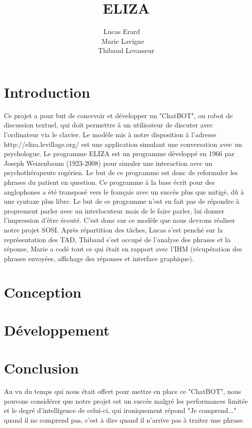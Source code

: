 \documentclass[a4paper,12pt]{article}
\title{ELIZA}
\author{Lucas Erard ~~\\ Marie Lavigne~~\\ Thibaud Levasseur}
\begin{document}
\maketitle
\newpage
\tableofcontents
\newpage
\section{Introduction}
Ce projet a pour but de concevoir et développer un "ChatBOT", ou robot de discussion textuel, qui doit permettre à un utilisateur de discuter avec l'ordinateur via le clavier. Le modèle mis à notre disposition à l'adresse http://eliza.levillage.org/ est une application simulant une conversation avec un psychologue.
Le programme ELIZA est un programme développé en 1966 par Joseph Weizenbaum (1923-2008) pour simuler une interaction avec un psychothérapeute rogérien. Le but de ce programme est donc de reformuler les phrases du patient en question.
Ce programme à la base écrit pour des anglophones a été transposé vers le français avec un succès  plus que mitigé, dû à une syntaxe plus libre.
Le but de ce programme n'est en fait pas de répondre à proprement parler avec un interlocuteur mais de le faire parler, lui donner l'impression d'être écouté.
C'est donc sur ce modèle que nous devrons réaliser notre projet SOSI.
Après répartition des tâches, Lucas s'est penché sur la représentation des TAD, Thibaud s'est occupé de l'analyse des phrases et la réponse, Marie a codé tout ce qui était en rapport avec l'IHM (récupération des phrases envoyées, affichage des réponses et interface graphique).
\section{Conception}

\section{Développement}

\section{Conclusion}
Au vu du temps qui nous était offert pour mettre en place ce "ChatBOT", nous pouvons considérer que notre projet est un succès malgré les performances limitée et le degré d'intelligence de celui-ci, qui ironiquement répond "Je comprend..." quand il ne comprend pas, c'est à dire quand il n'arrive pas à traiter une phrase.
\end{document}
